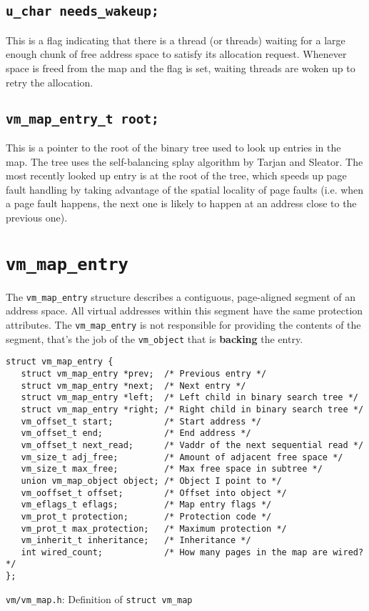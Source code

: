 \documentclass[shortabstract, english]{iithesis}
\begin{document}
\subsection*{\texttt{u_char needs_wakeup;}}
This is a flag indicating that there is a thread (or threads) waiting for a
large enough chunk of free address space to satisfy its allocation request.
Whenever space is freed from the map and the flag is set, waiting threads are
woken up to retry the allocation.

\subsection*{\texttt{vm_map_entry_t root;}}
This is a pointer to the root of the binary tree used to look up entries in the
map. The tree uses the self-balancing splay algorithm by Tarjan and Sleator. The
most recently looked up entry is at the root of the tree, which speeds up page
fault handling by taking advantage of the spatial locality of page faults (i.e.
when a page fault happens, the next one is likely to happen at an address close
to the previous one).

\section{\texttt{vm_map_entry}}

The \texttt{vm_map_entry} structure describes a contiguous, page-aligned
segment of an address space. All virtual addresses within this segment have
the same protection attributes. The \texttt{vm_map_entry} is not responsible
for providing the contents of the segment, that's the job of the
\texttt{vm_object} that is \textbf{backing} the entry.

\begin{listing}[H]
\begin{verbatim}
struct vm_map_entry {
   struct vm_map_entry *prev;  /* Previous entry */
   struct vm_map_entry *next;  /* Next entry */
   struct vm_map_entry *left;  /* Left child in binary search tree */
   struct vm_map_entry *right; /* Right child in binary search tree */
   vm_offset_t start;          /* Start address */
   vm_offset_t end;            /* End address */
   vm_offset_t next_read;      /* Vaddr of the next sequential read */
   vm_size_t adj_free;         /* Amount of adjacent free space */
   vm_size_t max_free;         /* Max free space in subtree */
   union vm_map_object object; /* Object I point to */
   vm_ooffset_t offset;        /* Offset into object */
   vm_eflags_t eflags;         /* Map entry flags */
   vm_prot_t protection;       /* Protection code */
   vm_prot_t max_protection;   /* Maximum protection */
   vm_inherit_t inheritance;   /* Inheritance */
   int wired_count;            /* How many pages in the map are wired? */
};
\end{verbatim}
\caption{\texttt{vm/vm\_map.h}: Definition of \texttt{struct vm_map}}
\end{listing}
\end{document}
